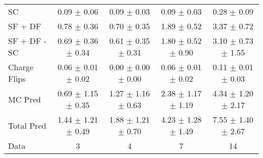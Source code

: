 \begin{tabular}{l|cccc}
                                 SC &  0.09 $\pm$  0.06 &  0.09 $\pm$  0.03 &  0.09 $\pm$  0.03 &  0.28 $\pm$  0.09 \\
                            SF + DF &  0.78 $\pm$  0.36 &  0.70 $\pm$  0.35 &  1.89 $\pm$  0.52 &  3.37 $\pm$  0.72 \\
\hline
                       SF + DF - SC &  0.69 $\pm$  0.36 $\pm$  0.34 &  0.61 $\pm$  0.35 $\pm$  0.31 &  1.80 $\pm$  0.52 $\pm$  0.90 &  3.10 $\pm$  0.73 $\pm$  1.55 \\
\hline\hline
                       Charge Flips &  0.06 $\pm$  0.01 $\pm$  0.02 &  0.00 $\pm$  0.00 $\pm$  0.00 &  0.06 $\pm$  0.01 $\pm$  0.02 &  0.11 $\pm$  0.01 $\pm$  0.03 \\
\hline
                            MC Pred &  0.69 $\pm$  1.15 $\pm$  0.35 &  1.27 $\pm$  1.16 $\pm$  0.63 &  2.38 $\pm$  1.17 $\pm$  1.19 &  4.34 $\pm$  1.20 $\pm$  2.17 \\
\hline
                         Total Pred &  1.44 $\pm$  1.21 $\pm$  0.49 &  1.88 $\pm$  1.21 $\pm$  0.70 &  4.23 $\pm$  1.28 $\pm$  1.49 &  7.55 $\pm$  1.40 $\pm$  2.67 \\
\hline\hline
                               Data &     3 &     4 &     7 &    14 \\
\hline\hline
\end{tabular}

